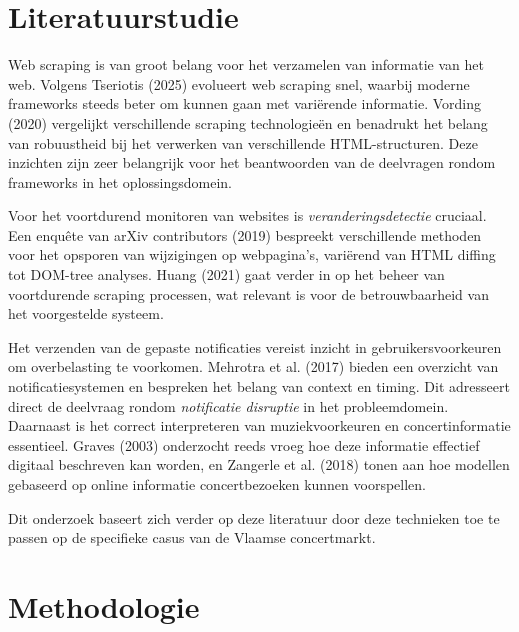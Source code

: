 
\section{Literatuurstudie}%
\label{sec:literatuurstudie}

Web scraping is van groot belang voor het verzamelen van informatie van het web. Volgens Tseriotis (2025) evolueert web scraping snel, waarbij moderne frameworks steeds beter om kunnen gaan met variërende informatie\autocite{Tseriotis2025}. Vording (2020) vergelijkt verschillende scraping technologieën en benadrukt het belang van robuustheid bij het verwerken van verschillende HTML-structuren\autocite{Vording2020}. Deze inzichten zijn zeer belangrijk voor het beantwoorden van de deelvragen rondom frameworks in het oplossingsdomein.

Voor het voortdurend monitoren van websites is \textit{veranderingsdetectie} cruciaal. Een enquête van arXiv contributors (2019) bespreekt verschillende methoden voor het opsporen van wijzigingen op webpagina's, variërend van HTML diffing tot DOM-tree analyses\autocite{ChangeSurvey2019}. Huang (2021) gaat verder in op het beheer van voortdurende scraping processen, wat relevant is voor de betrouwbaarheid van het voorgestelde systeem\autocite{Lin2021}.

Het verzenden van de gepaste notificaties vereist inzicht in gebruikersvoorkeuren om overbelasting te voorkomen. Mehrotra et al. (2017) bieden een overzicht van notificatiesystemen en bespreken het belang van context en timing\autocite{NotificationSurvey2017}. Dit adresseert direct de deelvraag rondom \textit{notificatie disruptie} in het probleemdomein. Daarnaast is het correct interpreteren van muziekvoorkeuren en concertinformatie essentieel. Graves (2003) onderzocht reeds vroeg hoe deze informatie effectief digitaal beschreven kan worden\autocite{Graves2003}, en Zangerle et al. (2018) tonen aan hoe modellen gebaseerd op online informatie concertbezoeken kunnen voorspellen\autocite{Zangerle2018}.

Dit onderzoek baseert zich verder op deze literatuur door deze technieken toe te passen op de specifieke casus van de Vlaamse concertmarkt.

\section{Methodologie}%
\label{sec:methodologie}

